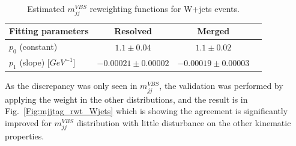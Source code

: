 \begin{table}[!h]
	\caption{Estimated $m_{jj}^{VBS}$ reweighting functions for W+jets events.}
	\label{tab:reweighting_summary_Wjets}
	\centering
	\begin{tabular}{lccc}
		\hline
		Fitting parameters            & Resolved             & Merged   \\
		\hline
		$p_0$ (constant)              & $ 1.1 \pm 0.04 $       &  $ 1.1 \pm 0.02 $    \\
		$p_1$ (slope) [$GeV^{-1}$]    & $ -0.00021 \pm 0.00002 $ &  $ -0.00019 \pm 0.00003 $  \\
		\hline
	\end{tabular}
\end{table}
As the discrepancy was only seen in $m_{jj}^{VBS}$, the validation was performed by applying the weight in the other distributions, and the result is in Fig.~\ref{Fig:mjjtag_rwt_Wjets} which is showing the agreement is significantly improved for $m_{jj}^{VBS}$ distribution with little disturbance on the other kinematic properties.
